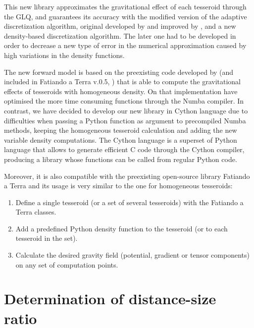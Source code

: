 \documentclass[extra]{gji}
\begin{document}
This new library approximates the gravitational effect of each tesseroid through the GLQ, and guarantees its accuracy with the modified version of the adaptive discretization algorithm, original developed by \citet{Li2011} and improved by \citet{Uieda2016}, and a new density-based discretization algorithm.
The later one had to be developed in order to decrease a new type of error in the numerical approximation caused by high variations in the density functions.

The new forward model is based on the preexisting code developed by \citet{Uieda2016} (and included in Fatiando a Terra v.0.5, \citet{Uieda2013}) that is able to compute the gravitational effects of tesseroids with homogeneous density.
On that implementation \citet{Uieda2016} have optimised the more time consuming functions through the Numba compiler.
In contrast, we have decided to develop our new library in Cython language due to difficulties when passing a Python function as argument to precompiled Numba methods, keeping the homogeneous tesseroid calculation and adding the new variable density computations.
The Cython language is a superset of Python language that allows to generate efficient C code through the Cython compiler, producing a library whose functions can be called from regular Python code.

Moreover, it is also compatible with the preexisting open-source library Fatiando a Terra and its usage is very similar to the one for homogeneous tesseroids:

\begin{enumerate}
\renewcommand{\theenumi}{(\arabic{enumi})}
    \item Define a single tesseroid (or a set of several tesseroids) with the Fatiando a Terra classes.
    \item Add a predefined Python density function to the tesseroid (or to each tesseroid in the set).
    \item Calculate the desired gravity field (potential, gradient or tensor components) on any set of computation points.
\end{enumerate}





\section{Determination of distance-size ratio}
\end{document}
